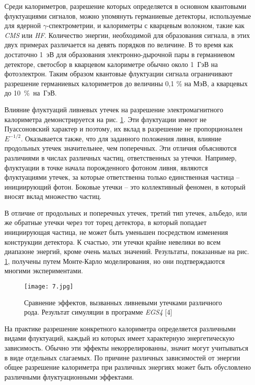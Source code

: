Среди  калориметров,  разрешение  которых  определяется  в  основном квантовыми  флуктуациями  сигналов,  можно  упомянуть  германиевые детекторы,  используемые  для  ядерной $\gamma$-спектрометрии,  и  калориметры  с кварцевым  волокном,  такие  как \textit{CMS} или \textit{HF}. Количество  энергии, необходимой для образования сигнала, в этих двух примерах различается на девять  порядков  по  величине.  В  то  время  как  достаточно  \mbox{1  эВ}  для образования электронно-дырочной пары в германиевом детекторе, светосбор в  кварцевом  калориметре  обычно  около  \mbox{1  ГэВ}  на  фотоэлектрон.  Таким образом   квантовые   флуктуации   сигнала   ограничивают   разрешение германиевых калориметров до величины 0,1 \% на МэВ, а кварцевых до \mbox{10 \% на ГэВ}.

Влияние    флуктуаций    ливневых    утечек    на    разрешение электромагнитного калориметра демонстрируется на рис. \ref{fig:leak}. Эти флуктуации имеют  не  Пуассоновский  характер  и  поэтому,  их  вклад  в  разрешение  не пропорционален $E^{-1/2}$. Оказывается  также,  что  для  заданного  положения ливня,  влияние  продольных  утечек  значительнее,  чем  поперечных.  Эти отличия объясняются различиями в числах различных частиц, ответственных за  утечки.  Например,  флуктуации  в  точке  начала  порожденного  фотоном ливня,  являются  флуктуациями  утечек,  за  которые  ответственна  только единственная  частица – инициирующий  фотон.  Боковые  утечки – это коллективный феномен, в который вносят вклад множество частиц.

В  отличие  от  продольных  и  поперечных  утечек,  третий  тип  утечек, альбедо,  или  же  обратные  утечки  через  тот  торец  детектора,  в  который попадает  инициирующая  частица,  не  может  быть  уменьшен  посредством изменения конструкции детектора. К счастью, эти утечки крайне невелики во всем  диапазоне  энергий,  кроме  очень  малых  значений. Результаты, показанные на рис. \ref{fig:leak}, получены путем Монте-Карло моделирования, но они подтверждаются многими экспериментами.

\begin{figure}[H]
    \centering
    \texttt{[image: 7.jpg]}
    \caption{Сравнение эффектов, вызванных ливневыми утечками различного рода. Результат симуляции в программе \textit{EGS4} [4]}
    \label{fig:leak}
\end{figure}

На практике разрешение конкретного калориметра определяется различными видами флуктуаций, каждый из которых имеет характерную энергетическую зависимость.  Обычно  эти  эффекты  некоррелированны,  значит  могут учитываться  в  виде  отдельных  слагаемых.  По  причине  различных зависимостей  от  энергии  общее  разрешение  калориметра  при  различных энергиях   может   быть   обусловлено   различными   флуктуационными эффектами.

